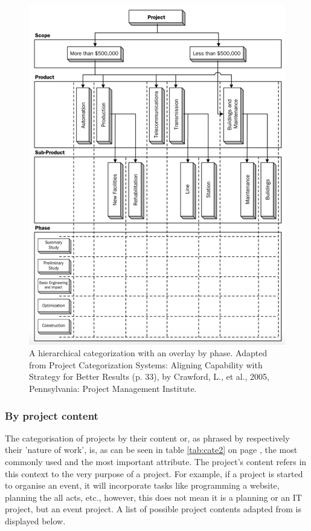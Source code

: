 \begin{figure}[!hbt]
    \captionsetup{font=small}
  \centering
  \includegraphics[width=.45\columnwidth]{figures/multidimensional_system.png}
  \caption[A hierarchical categorization with an overlay by phase]{A hierarchical categorization with an overlay by phase. Adapted from Project Categorization Systems: Aligning Capability with Strategy for Better Results (p. 33), by Crawford, L., et al., 2005, Pennsylvania: Project Management Institute.}
  \label{fig:cate}
\end{figure}


\subsubsection{By project content}
The categorisation of projects by their content or, as phrased by   respectively their 'nature of work', is, as can be seen in table \ref{tab:cate2} on page \pageref{tab:cate2}, the  most commonly used and the  most important attribute. The project's content refers in this context to the very purpose of a project. For example, if a project is started to organise an event, it will incorporate tasks like programming a website, planning the all acts, etc., however, this does not mean it is a planning or an IT project, but an event project. 
A list of possible project contents adapted from  is displayed below. 

